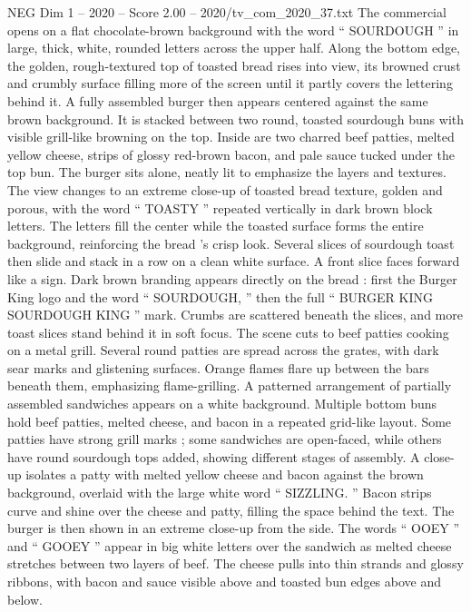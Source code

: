\begin{textsample}{NEG Dim 1 – 2020 – Score 2.00 – 2020/tv\_com\_2020\_37.txt}  \label{ex:f1_neg_087}
The commercial opens on a flat chocolate-brown background with the word “ SOURDOUGH ” in large, thick, white, rounded letters across the upper half.
Along the bottom edge, the golden, rough-textured top of toasted bread rises into view, its browned crust and crumbly surface filling more of the screen until it partly covers the lettering behind it.
A fully assembled burger then appears centered against the same brown background.
It is stacked between two round, toasted sourdough buns with visible grill-like browning on the top.
Inside are two charred beef patties, melted yellow cheese, strips of glossy red-brown bacon, and pale sauce tucked under the top bun.
The burger sits alone, neatly lit to emphasize the layers and textures.
The view changes to an extreme close-up of toasted bread texture, golden and porous, with the word “ TOASTY ” repeated vertically in dark brown block letters.
The letters fill the center while the toasted surface forms the entire background, reinforcing the bread ’s crisp look.
Several slices of sourdough toast then slide and stack in a row on a clean white surface.
A front slice faces forward like a sign.
Dark brown branding appears directly on the bread : first the Burger King logo and the word “ SOURDOUGH, ” then the full “ BURGER KING SOURDOUGH KING ” mark.
Crumbs are scattered beneath the slices, and more toast slices stand behind it in soft focus.
The scene cuts to beef patties cooking on a metal grill.
Several round patties are spread across the grates, with dark sear marks and glistening surfaces.
Orange flames flare up between the bars beneath them, emphasizing flame-grilling.
A patterned arrangement of partially assembled sandwiches appears on a white background.
Multiple bottom buns hold beef patties, melted cheese, and bacon in a repeated grid-like layout.
Some patties have strong grill marks ; some sandwiches are open-faced, while others have round sourdough tops added, showing different stages of assembly.
A close-up isolates a patty with melted yellow cheese and bacon against the brown background, overlaid with the large white word “ SIZZLING. ” Bacon strips curve and shine over the cheese and patty, filling the space behind the text.
The burger is then shown in an extreme close-up from the side.
The words “ OOEY ” and “ GOOEY ” appear in big white letters over the sandwich as melted cheese stretches between two layers of beef.
The cheese pulls into thin strands and glossy ribbons, with bacon and sauce visible above and toasted bun edges above and below.

\end{textsample}

